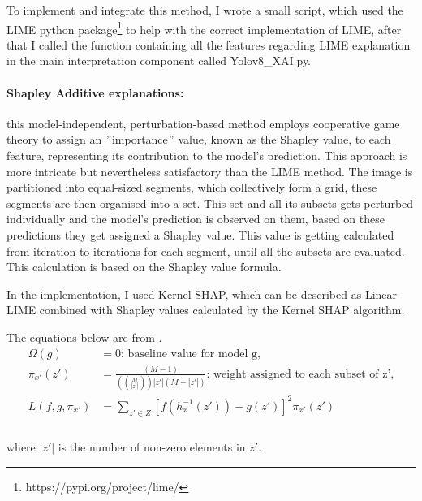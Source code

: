 To implement and integrate this method, I wrote a small script, which used the LIME python package\footnote{https://pypi.org/project/lime/} to help with the correct implementation of LIME, after that I called the function containing all the features regarding LIME explanation in the main interpretation component called Yolov8\_XAI.py.

\paragraph{Shapley Additive explanations:}\label{par:shap}

this model-independent, perturbation-based method employs cooperative game theory to assign an \("\)importance\("\) value,
known as the Shapley value, to each feature, representing its contribution to the model's prediction.
This approach is more intricate but nevertheless satisfactory than the LIME method.
The image is partitioned into equal-sized segments, which collectively form a grid, these segments are then organised into a set.
This set and all its subsets gets perturbed individually and the model's prediction is observed on them, based on these predictions
they get assigned a Shapley value.
This value is getting calculated from iteration to iterations for each segment, until all the subsets are evaluated.
This calculation is based on the Shapley value formula.

In the implementation, I used Kernel SHAP, which can be described as Linear LIME combined with Shapley values calculated by the Kernel SHAP algorithm.

\begin{theorem}
\end{theorem}
\label{corr:shap_kernel}
The equations below are from \cite{lundberg2017unifiedapproachinterpretingmodel}.
\begin{equation}
\begin{split}
\Omega(g) &= 0 \text{: baseline value for model g,}\\
\pi_{x'}(z') &= \frac{(M-1)}{(\binom{M}{|z'|}) |z'| (M - |z'|)}\text{: weight assigned to each subset of z',} \\
L(f,g,\pi_{x'}) &= \sum_{z' \in Z} \left[ f(h_x^{-1}(z')) - g(z') \right]^2 \pi_{x'}(z') \\
\label{eq:kernel}
\end{split}
\end{equation}
\vspace{-0.4cm} \\where $|z'|$ is the number of non-zero elements in $z'$.


